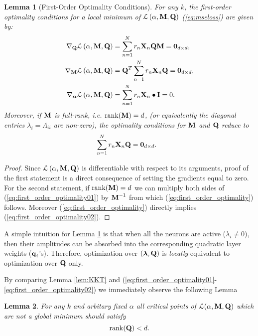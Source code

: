 \documentclass[11pt]{article}
\theoremstyle{plain}
\newtheorem{lemma}{Lemma}
\DeclareMathOperator*{\rank}{rank}
\theoremstyle{plain}
\numberwithin{equation}{section}
\numberwithin{lemma}{section}
\numberwithin{theorem}{section}
\numberwithin{corollary}{section}
\numberwithin{observation}{section}
\numberwithin{definition}{section}
\numberwithin{example}{section}
\begin{document}
\begin{lemma}[First-Order Optimality Conditions] \label{lem:modified_kkt}
For any $k$, the first-order optimality conditions for a local minimum of $\mathcal{L} \left(\alpha, {\Mx{M},\Mx{Q}} \right)$ (\ref{eq:mseloss}) are given by:
\begin{align}
{\nabla}_{\Mx{Q}}  \mathcal{L} \left(\alpha, {\Mx{M},\Mx{Q}} \right)  &= \sum_{n=1}^N r_n \Mx{X}_n \Mx{Q} \Mx{M} = \V{0}_{d \times d}, \label{eq:first_order_optimality01} \\
{\nabla}_{\Mx{M}} \mathcal{L} \left(\alpha, {\Mx{M},\Mx{Q}} \right) &= \Mx{Q}^T \sum_{n=1}^N r_n \Mx{X}_n \Mx{Q} = \Mx{0}_{d \times d}, \label{eq:first_order_optimality02}\\
{\nabla}_{\Mx{\alpha}} \mathcal{L} \left(\alpha, {\Mx{M},\Mx{Q}} \right) & = \sum_{n=1}^N r_n \Mx{X}_n \bullet \Mx{I} = 0. \label{eq:optimality_alpha}
\end{align}
Moreover, if $\Mx{M}$ is full-rank, i.e. $\rank(\Mx{M}) =d$, (or equivalently the diagonal entries $\lambda_i = \Lambda_{ii}$ are non-zero), the optimality conditions for $\Mx{M}$ and $\Mx{Q}$ reduce to
\begin{align}\label{eq:first_order_optimality}
&\sum_{n=1}^N r_n \Mx{X}_n \Mx{Q} = \Mx{0}_{d \times d}.
\end{align}
\end{lemma}
\begin{proof}
Since $\mathcal{L} \left(\alpha, {\Mx{M},\Mx{Q}} \right)$ is differentiable with respect to its arguments, proof of the first statement is a direct consequence of setting the gradients equal to zero. For the second statement, if $\rank(\Mx{M}) = d$ we can multiply both sides of (\ref{eq:first_order_optimality01}) by $\Mx{M}^{-1}$ from which (\ref{eq:first_order_optimality}) follows.
\noindent Moreover (\ref{eq:first_order_optimality}) directly implies (\ref{eq:first_order_optimality02}).
\end{proof}

A simple intuition for Lemma \ref{lem:modified_kkt} is that when all the neurons are active ($\lambda_i \neq 0$), then their amplitudes can be absorbed into the corresponding quadratic layer weights ($\V{q}_i$'s). Therefore, optimization over $(\V{\lambda},\Mx{Q})$ is \textit{locally} equivalent to optimization over $\Mx{Q}$ only.


By comparing  Lemma \ref{lem:KKT} and (\ref{eq:first_order_optimality01}-\ref{eq:first_order_optimality02}) we immediately observe the following Lemma 
\begin{lemma} \label{lem:lr_stationary} For any $k$ and arbitary fixed $\alpha$ all critical points of $\mathcal{L}(\alpha,\Mx{M},\Mx{Q})$ which are not a global minimum should satisfy
\begin{equation}
    \rank(\Mx{Q}) < d.
\end{equation}
\end{lemma}
\end{document}
